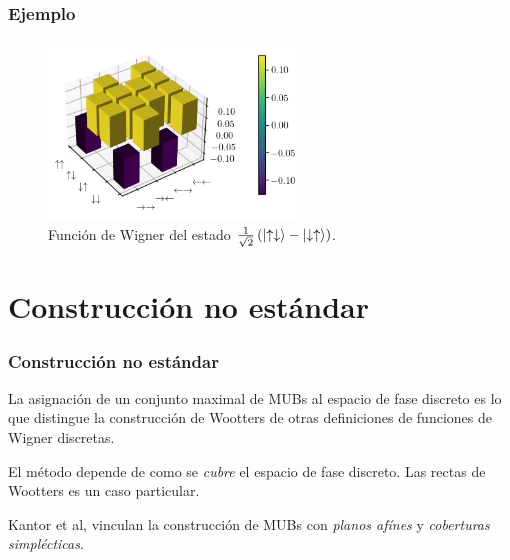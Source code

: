 \documentclass[10pt]{beamer}
\begin{document}
  \begin{frame}
    \frametitle{Ejemplo}

    \begin{figure}[h]
      \centering
      \includegraphics[width=0.6\textwidth]{
      imgs/wigner-desargues-2-2-s2.png}
      \caption{Función de Wigner del estado
      $\frac{1}{\sqrt{2}} \left(
        \ket{\uparrow\downarrow} -
      \ket{\downarrow\uparrow}\right)$.}
      \label{fig:wigner-desargues-2-2-s2}
    \end{figure}
  \end{frame}

  \section{Construcción no estándar}

  \begin{frame}
    \frametitle{Construcción no estándar}

    La asignación de un conjunto maximal de MUBs al espacio
    de fase discreto es lo que distingue la construcción de
    Wootters de otras definiciones de funciones de Wigner
    discretas.

    \vspace{15pt}

    \pause

    El método depende de como se \textit{cubre} el espacio
    de fase discreto. Las rectas de Wootters es un caso
    particular.

    \vspace{15pt}

    Kantor et al, vinculan la construcción de MUBs con
    \textit{planos afínes} y \textit{coberturas
    simplécticas}.
  \end{frame}
\end{document}
